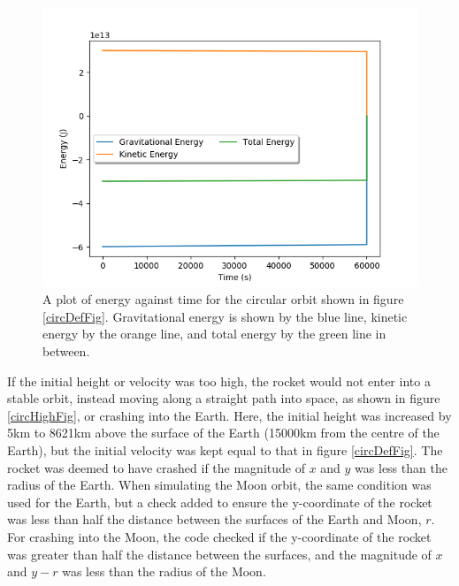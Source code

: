 \documentclass[twocolumn,prl,nobalancelastpage,aps,10pt]{revtex4-1}
\begin{document}
\begin{figure}[ht]
	\includegraphics*[width=0.96\linewidth,clip]{circularDefaultEnergy}
	\caption{A plot of energy against time for the circular orbit shown in figure \ref{circDefFig}. Gravitational energy is shown by the blue line, kinetic energy by the orange line, and total energy by the green line in between.} \label{circDefEn}
\end{figure}

If the initial height or velocity was too high, the rocket would not enter into a stable orbit, instead moving along a straight path into space, as shown in figure \ref{circHighFig}, or crashing into the Earth. Here, the initial height was increased by 5km to 8621km above the surface of the Earth (15000km from the centre of the Earth), but the initial velocity was kept equal to that in figure \ref{circDefFig}. The rocket was deemed to have crashed if the magnitude of  $x$ and $y$ was less than the radius of the Earth. When simulating the Moon orbit, the same condition was used for the Earth, but a check added to ensure the y-coordinate of the rocket was less than half the distance between the surfaces of the Earth and Moon, $r$. For crashing into the Moon, the code checked if the y-coordinate of the rocket was greater than half the distance between the surfaces, and the magnitude of $x$ and $y-r$ was less than the radius of the Moon.
\end{document}
